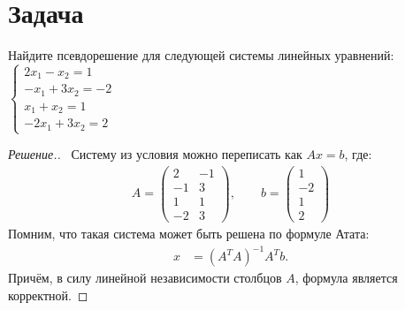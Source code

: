 \documentclass[a4paper]{article}
\theoremstyle{remark}
\newcommand{\eq}[1]{\begin{cases} #1 \end{cases}}
\begin{document}
    \section*{Задача }
        Найдите псевдорешение для следующей системы линейных уравнений: 
        $\eq{
            2x_1 - x_2 = 1\\
            -x_1 + 3x_2 = -2 \\
            x_1 + x_2 = 1 \\
            -2x_1 + 3x_2 = 2
        }$
        \begin{proof}[Решение.] \ 
        Систему из условия можно переписать как $Ax = b$, где:
        \begin{align*}
          A = \begin{pmatrix}
            2 & -1 \\
            -1 & 3 \\
            1 & 1 \\
            -2 & 3 
          \end{pmatrix}, \quad\quad 
          b = \begin{pmatrix}
            1 \\
            -2 \\
            1 \\
            2
          \end{pmatrix}
        \end{align*}
        Помним, что такая система может быть решена по формуле Атата:
        \begin{align*}
          x &= (A^TA)^{-1}A^Tb.
        \end{align*}
        Причём, в силу линейной независимости столбцов $A$, формула является корректной.


\end{proof}
\end{document}
